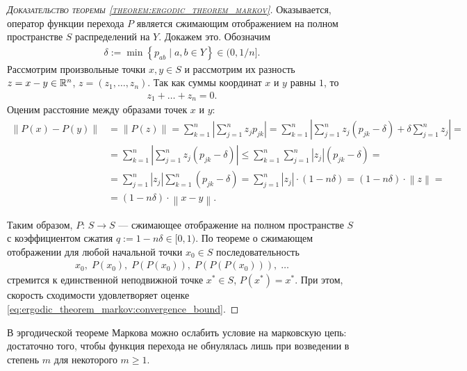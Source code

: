 \documentclass[../main.tex]{subfiles}
\begin{document}
\begin{proof}[\normalfont\textsc{Доказательство теоремы \ref{theorem:ergodic_theorem_markov}}]
 Оказывается, оператор функции перехода $ P $ является сжимающим отображением на полном пространстве $ S $ распределений на $ Y $. Докажем это. Обозначим
 \begin{align*}
  \delta := \min \left\{ p_{ab} \mid a,b\in Y \right\} \in (0, 1 / n].
 \end{align*} Рассмотрим произвольные точки $ x,y \in S $ и рассмотрим их разность $z=x-y \in \mathbb{R}^{n}$, $ z=(z_1,\ldots,z_n) $. Так как суммы координат $ x $ и $ y $ равны $ 1 $, то
 \begin{align*}
  z_1 + \ldots + z_n = 0.
 \end{align*} Оценим расстояние между образами точек $ x $ и $ y $:
 \begin{align*}
  \left\| P(x)-P(y) \right\| &= \left\| P(z) \right\| = \sum_{k=1}^{n} \left| \sum_{j=1}^{n}z_jp_{jk} \right| = \sum_{k=1}^{n} \left| \sum_{j=1}^{n}z_j(p_{jk} - \delta) + \delta \sum_{j=1}^{n}z_j \right| = \\
  &= \sum_{k=1}^{n} \left| \sum_{j=1}^{n} z_j (p_{jk}-\delta) \right| \leqslant \sum_{k=1}^{n}\sum_{j=1}^{n} \left| z_j \right|(p_{jk}-\delta) = \\
  &= \sum_{j=1}^{n}\left| z_j \right| \sum_{k=1}^{n} (p_{jk} - \delta) = \sum_{j=1}^{n} \left| z_j \right| \cdot (1 - n\delta) = (1 - n\delta) \cdot \left\| z \right\| = \\
  &= (1-n\delta)\cdot \left\| x-y \right\|.
 \end{align*}

 Таким образом, $ P \colon\,S \to S $ --- сжимающее отображение на полном пространстве $ S $ с коэффициентом сжатия $ q := 1 - n \delta \in [0, 1) $. По теореме о сжимающем отображении для любой начальной точки $ x_0 \in S $ последовательность
 \begin{align*}
  x_0,\; P(x_0),\;P(P(x_0)),\;P(P(P(x_0))),\;\ldots
 \end{align*} стремится к единственной неподвижной точке $ x^{\ast} \in S $, $ P(x^{\ast}) = x^{\ast} $. При этом, скорость сходимости удовлетворяет оценке \eqref{eq:ergodic_theorem_markov:convergence_bound}.
\end{proof}

В эргодической теореме Маркова можно ослабить условие на марковскую цепь: достаточно того, чтобы функция перехода не обнулялась лишь при возведении в степень $ m $ для некоторого $ m \geqslant 1 $.
\end{document}

